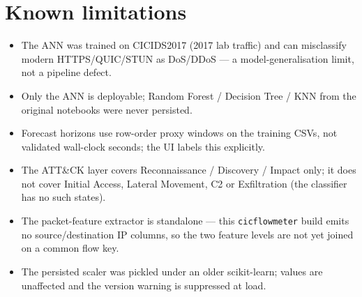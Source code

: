 \documentclass[11pt,a4paper]{article}
\begin{document}
\section{Known limitations}

\begin{itemize}
  \item The ANN was trained on CICIDS2017 (2017 lab traffic) and can
  misclassify modern HTTPS/QUIC/STUN as DoS/DDoS --- a model-generalisation
  limit, not a pipeline defect.
  \item Only the ANN is deployable; Random Forest / Decision Tree / KNN from
  the original notebooks were never persisted.
  \item Forecast horizons use row-order proxy windows on the training CSVs,
  not validated wall-clock seconds; the UI labels this explicitly.
  \item The ATT\&CK layer covers Reconnaissance / Discovery / Impact only;
  it does not cover Initial Access, Lateral Movement, C2 or Exfiltration
  (the classifier has no such states).
  \item The packet-feature extractor is standalone --- this
  \texttt{cicflowmeter} build emits no source/destination IP columns, so the
  two feature levels are not yet joined on a common flow key.
  \item The persisted scaler was pickled under an older scikit-learn; values
  are unaffected and the version warning is suppressed at load.
\end{itemize}
\end{document}
